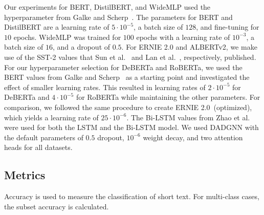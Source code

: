 \documentclass[runningheads]{llncs}
\begin{document}
Our experiments for BERT, DistilBERT, and WideMLP used the hyperparameter from Galke and Scherp~\cite{galkeMLP}.
The parameters for BERT and DistilBERT are a learning rate of $5 \cdot 10^{-5}$, a batch size of $128$, and fine-tuning for $10$  epochs.
WideMLP was trained for $100$ epochs with a learning rate of $10^{-3}$, a batch size of $16$, and a dropout of $0.5$.
For ERNIE 2.0 and ALBERTv2, we make use of the SST-2 values that Sun et al.~\cite{ERNIE} and Lan et al.~\cite{albert2019}, respectively, published.
For our hyperparameter selection for DeBERTa and RoBERTa, we used the BERT values from Galke and Scherp~\cite{galkeMLP} as a starting point and investigated the effect of smaller learning rates.
This resulted in learning rates of $2 \cdot 10^{-5}$ for DeBERTa and $4 \cdot 10^{-5}$ for RoBERTa while maintaining the other parameters.
For comparison, we followed the same procedure to create ERNIE 2.0~(optimized), which yields a learning rate of $25 \cdot 10^{-6}$.
The Bi-LSTM values from Zhao et al.~\cite{zhao2021sequential} were used for both the LSTM and the Bi-LSTM model.
We used DADGNN with the default parameters of $0.5$ dropout, $10^{-6}$ weight decay, and two attention heads for all datasets.

\subsection{Metrics}
\label{sec:metrics}
Accuracy is used to measure the classification of short text. 
For multi-class cases, the subset accuracy is calculated.
\end{document}
